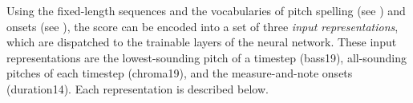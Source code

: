 
Using the fixed-length sequences and the vocabularies of
pitch spelling (see
) and onsets (see
), the
score can be encoded into a set of three \emph{input
representations}, which are dispatched to the trainable
layers of the neural network. These input representations
are the lowest-sounding pitch of a timestep (\gls{bass19}),
all-sounding pitches of each timestep (\gls{chroma19}), and
the measure-and-note onsets (\gls{duration14}). Each
representation is described below.
